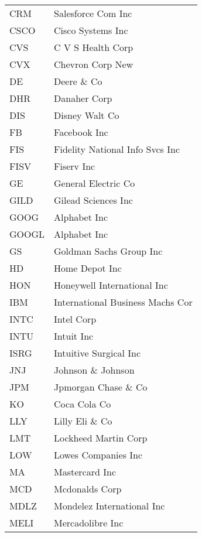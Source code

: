 \begin{tabular}{ll}
CRM    &                Salesforce Com Inc \\
CSCO   &                 Cisco Systems Inc \\
CVS    &                 C V S Health Corp \\
CVX    &                  Chevron Corp New \\
DE     &                       Deere \& Co \\
DHR    &                      Danaher Corp \\
DIS    &                    Disney Walt Co \\
FB     &                      Facebook Inc \\
FIS    &   Fidelity National Info Svcs Inc \\
FISV   &                        Fiserv Inc \\
GE     &               General Electric Co \\
GILD   &               Gilead Sciences Inc \\
GOOG   &                      Alphabet Inc \\
GOOGL  &                      Alphabet Inc \\
GS     &           Goldman Sachs Group Inc \\
HD     &                    Home Depot Inc \\
HON    &       Honeywell International Inc \\
IBM    &  International Business Machs Cor \\
INTC   &                        Intel Corp \\
INTU   &                        Intuit Inc \\
ISRG   &            Intuitive Surgical Inc \\
JNJ    &                Johnson \& Johnson \\
JPM    &              Jpmorgan Chase \& Co \\
KO     &                      Coca Cola Co \\
LLY    &                   Lilly Eli \& Co \\
LMT    &              Lockheed Martin Corp \\
LOW    &               Lowes Companies Inc \\
MA     &                    Mastercard Inc \\
MCD    &                    Mcdonalds Corp \\
MDLZ   &        Mondelez International Inc \\
MELI   &                  Mercadolibre Inc \\

\end{tabular}
